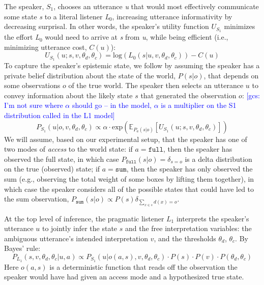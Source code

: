 \documentclass[preprint,12pt,authoryear,titlepage]{elsarticle}
\newcommand{\gcs}[1]{\textcolor{blue}{[gcs: #1]}}
\begin{document}
The speaker, $S_{1}$, chooses an utterance \emph{u} that would most effectively communicate some state \emph{s} to a literal listener \emph{L}$_{0}$, increasing utterance informativity by decreasing surprisal.  In other words, the speaker's utility function $U_{S_{1}}$ minimizes the effort \emph{L}$_{0}$ would need to arrive at \emph{s} from \emph{u}, while being efficient (i.e., minimizing utterance cost, $C(u)$):
$$U_{S_{1}}(u;s,v,\theta_d,\theta_c) = \textrm{log}(L_{0}(s|u,v,\theta_d,\theta_c)) - C(u)$$
To capture the speaker's epistemic state, we follow \cite{goodmanstuhlmuller2013} by assuming the speaker has a private belief distribution about the state of the world, $P(s|o)$, that depends on some observations $o$ of the true world. 
The speaker then selects an utterance $u$ to convey information about the likely state $s$ that generated the observation $o$: \gcs{I'm not sure where $\alpha$ should go -- in the model, $\alpha$ is a multiplier on the S1 distribution called in the L1 model}
$$P_{S_{1}} (u|o,v,\theta_d,\theta_c) \propto \alpha \cdot \textrm{exp}(\mathbb{E}_{P_a(s|o)}[U_{S_{1}} (u;s,v,\theta_d,\theta_c)])$$
We will assume, based on our experimental setup, that the speaker has one of two modes of \emph{access} to the world state: if $a=\texttt{full}$, then the speaker has observed the full state, in which case $P_{\texttt{full}}(s|o) = \delta_{s=o}$ is a delta distribution on the true (observed) state; if $a=\texttt{sum}$, then the speaker has only observed the sum (e.g., observing the total weight of some boxes by lifting them together), in which case the speaker considers all of the possible states that could have led to the sum observation, $P_{\texttt{sum}}(s|o)\propto P(s)\delta_{\sum_{x\in s} d(x) = o}$.

%


At the top level of inference, the pragmatic listener $L_{1}$ interprets the speaker's utterance $u$ to jointly infer the state $s$ and
the free interpretation variables: the ambiguous utterance's intended interpretation $v$, and the thresholds $\theta_d$, $\theta_c$. %
By Bayes' rule:
$$P_{L_{1}}(s,v,\theta_d,\theta_c|u,a) \propto P_{S_{1}}(u|o(a,s),v,\theta_d,\theta_c) \cdot P(s) \cdot P(v) \cdot P(\theta_d,\theta_c)$$
Here $o(a,s)$ is a deterministic function that reads off the observation the speaker would have had given an access mode and a hypothesized true state.
\end{document}
